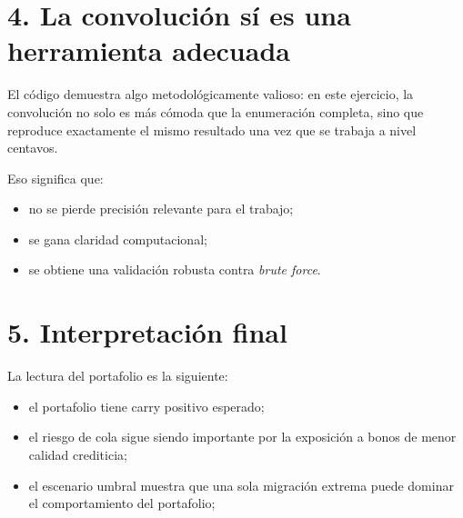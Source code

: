 \section*{4. La convoluci\'on s\'i es una herramienta adecuada}

El c\'odigo demuestra algo metodol\'ogicamente valioso: en este ejercicio, la convoluci\'on no solo es m\'as c\'omoda que la enumeraci\'on completa, sino que reproduce exactamente el mismo resultado una vez que se trabaja a nivel centavos.

Eso significa que:

\begin{itemize}
  \item no se pierde precisi\'on relevante para el trabajo;
  \item se gana claridad computacional;
  \item se obtiene una validaci\'on robusta contra \textit{brute force}.
\end{itemize}

\section*{5. Interpretaci\'on final}

La lectura del portafolio es la siguiente:

\begin{itemize}
  \item el portafolio tiene carry positivo esperado;
  \item el riesgo de cola sigue siendo importante por la exposici\'on a bonos de menor calidad crediticia;
  \item el escenario umbral \texttt{\ThresholdScenario} muestra que una sola migraci\'on extrema puede dominar el comportamiento del portafolio;
\end{itemize}
